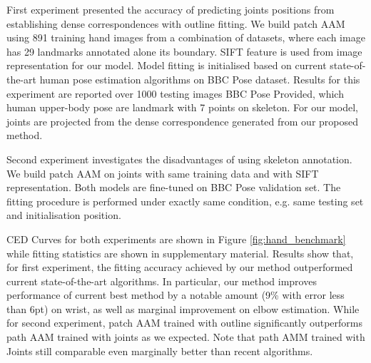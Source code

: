 First experiment presented the accuracy of predicting joints positions from establishing dense correspondences with outline fitting. We build patch AAM using 891 training hand images from a combination of datasets, where each image has 29 landmarks annotated alone its boundary. SIFT \cite{PoseletsICCV09} feature is used from image representation for our model. Model fitting is initialised based on current state-of-the-art human pose estimation algorithms on BBC Pose dataset. Results for this experiment are reported over 1000 testing images BBC Pose Provided, which human upper-body pose are landmark with 7 points on skeleton. For our model, joints are projected from the dense correspondence generated from our proposed method.

Second experiment investigates the disadvantages of using skeleton annotation. We build patch AAM on joints with same training data and with SIFT representation. Both models are fine-tuned on BBC Pose validation set. The fitting procedure is performed under exactly same condition, e.g. same testing set and initialisation position. 

CED Curves for both experiments are shown in Figure \ref{fig:hand_benchmark} while fitting statistics are shown in supplementary material. Results show that, for first experiment, the fitting accuracy achieved by our method outperformed current state-of-the-art algorithms. In particular, our method improves performance of current best method \cite{pfister2015flowing} by a notable amount (9\% with error less than 6pt) on wrist, as well as marginal improvement on elbow estimation. While for second experiment, patch AAM trained with outline significantly outperforms path AAM trained with joints as we expected. Note that path AMM trained with Joints still comparable even marginally better than recent algorithms.




